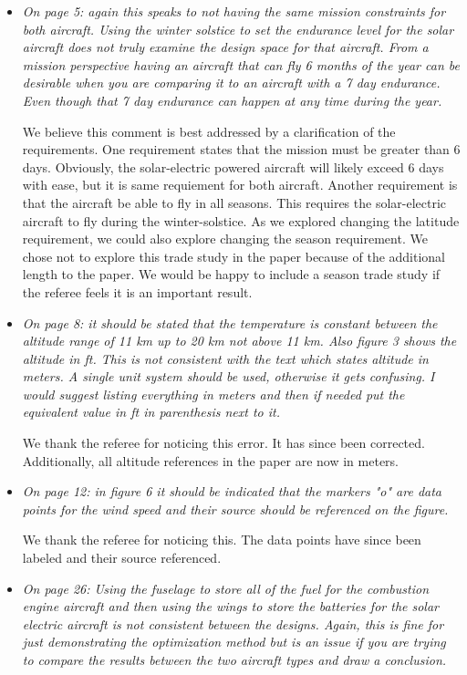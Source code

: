 \documentclass[10pt, a4paper]{article}
\begin{document}
\begin{itemize}
    \item \emph{On page 5: again this speaks to not having the same mission constraints for both aircraft. Using the winter solstice to set the endurance level for the solar aircraft does not truly examine the design space for that aircraft. From a mission perspective having an aircraft that can fly 6 months of the year can be desirable when you are comparing it to an aircraft with a 7 day endurance. Even though that 7 day endurance can happen at any time during the year.}

        We believe this comment is best addressed by a clarification of the requirements.  One requirement states that the mission must be greater than 6 days.  Obviously, the solar-electric powered aircraft will likely exceed 6 days with ease, but it is same requiement for both aircraft.  Another requirement is that the aircraft be able to fly in all seasons.  This requires the solar-electric aircraft to fly during the winter-solstice.  As we explored changing the latitude requirement, we could also explore changing the season requirement.  We chose not to explore this trade study in the paper because of the additional length to the paper.  We would be happy to include a season trade study if the referee feels it is an important result. 

    \item \emph{On page 8: it should be stated that the temperature is constant between the altitude range of 11 km up to 20 km not above 11 km. Also figure 3 shows the altitude in ft. This is not consistent with the text which states altitude in meters. A single unit system should be used, otherwise it gets confusing. I would suggest listing everything in meters and then if needed put the equivalent value in ft in parenthesis next to it.}

        We thank the referee for noticing this error.  It has since been corrected.  Additionally, all altitude references in the paper are now in meters.

    \item \emph{On page 12: in figure 6 it should be indicated that the markers "o" are data points for the wind speed and their source should be referenced on the figure.}

        We thank the referee for noticing this.  The data points have since been labeled and their source referenced. 

    \item \emph{On page 26: Using the fuselage to store all of the fuel for the combustion engine aircraft and then using the wings to store the batteries for the solar electric aircraft is not consistent between the designs. Again, this is fine for just demonstrating the optimization method but is an issue if you are trying to compare the results between the two aircraft types and draw a conclusion.}


\end{itemize}
\end{document}
